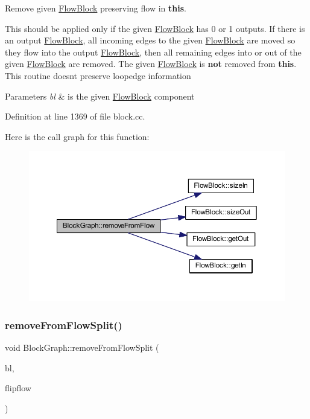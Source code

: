 Remove given \mbox{\hyperlink{class_flow_block}{Flow\+Block}} preserving flow in {\bfseries{this}}. 

This should be applied only if the given \mbox{\hyperlink{class_flow_block}{Flow\+Block}} has 0 or 1 outputs. If there is an output \mbox{\hyperlink{class_flow_block}{Flow\+Block}}, all incoming edges to the given \mbox{\hyperlink{class_flow_block}{Flow\+Block}} are moved so they flow into the output \mbox{\hyperlink{class_flow_block}{Flow\+Block}}, then all remaining edges into or out of the given \mbox{\hyperlink{class_flow_block}{Flow\+Block}} are removed. The given \mbox{\hyperlink{class_flow_block}{Flow\+Block}} is {\bfseries{not}} removed from {\bfseries{this}}. This routine doesn\textquotesingle{}t preserve loopedge information 
\begin{DoxyParams}{Parameters}
{\em bl} & is the given \mbox{\hyperlink{class_flow_block}{Flow\+Block}} component \\
\hline
\end{DoxyParams}


Definition at line 1369 of file block.\+cc.

Here is the call graph for this function\+:
\nopagebreak
\begin{figure}[H]
\begin{center}
\leavevmode
\includegraphics[width=350pt]{class_block_graph_ae61430ab00f3437f85016b0c76907e94_cgraph}
\end{center}
\end{figure}
\mbox{\label{class_block_graph_a8c6e3329fe131f587a472413dfd60fcd}} 
\subsubsection{\texorpdfstring{removeFromFlowSplit()}{removeFromFlowSplit()}}
{\footnotesize\ttfamily void Block\+Graph\+::remove\+From\+Flow\+Split (\begin{DoxyParamCaption}\item[{\mbox{\hyperlink{class_flow_block}{Flow\+Block}} $\ast$}]{bl,  }\item[{bool}]{flipflow }\end{DoxyParamCaption})}



